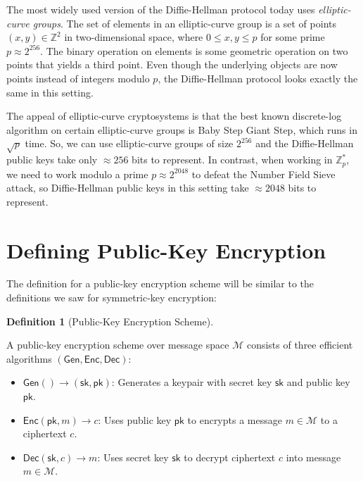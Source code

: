 \documentclass[
  letterpaper,
]{scrbook}
\providecommand{\tightlist}{%
  \setlength{\itemsep}{0pt}\setlength{\parskip}{0pt}}
\newcommand{\Z}{\mathbb{Z}}
\newcommand{\calM}{\mathcal{M}}
\newcommand{\Enc}{\mathsf{Enc}}
\newcommand{\Dec}{\mathsf{Dec}}
\newcommand{\Gen}{\mathsf{Gen}}
\newcommand{\sk}{\mathsf{sk}}
\newcommand{\pk}{\mathsf{pk}}
\theoremstyle{definition}
\newtheorem{definition}{Definition}[chapter]
\theoremstyle{plain}
\theoremstyle{plain}
\theoremstyle{remark}
\begin{document}
The most widely used version of the Diffie-Hellman protocol today uses
\emph{elliptic-curve groups}. The set of elements in an elliptic-curve
group is a set of points \((x,y) \in \Z^2\) in two-dimensional space,
where \(0 \leq x, y \leq p\) for some prime \(p \approx 2^{256}\). The
binary operation on elements is some geometric operation on two points
that yields a third point. Even though the underlying objects are now
points instead of integers modulo \(p\), the Diffie-Hellman protocol
looks exactly the same in this setting.

The appeal of elliptic-curve cryptosystems is that the best known
discrete-log algorithm on certain elliptic-curve groups is Baby Step
Giant Step, which runs in \(\sqrt p\) time. So, we can use
elliptic-curve groups of size \(2^{256}\) and the Diffie-Hellman public
keys take only \(\approx 256\) bits to represent. In contrast, when
working in \(\Z^*_p\), we need to work modulo a prime
\(p \approx 2^{2048}\) to defeat the Number Field Sieve attack, so
Diffie-Hellman public keys in this setting take \(\approx 2048\) bits to
represent.

\section{Defining Public-Key
Encryption}\label{defining-public-key-encryption}

The definition for a public-key encryption scheme will be similar to the
definitions we saw for symmetric-key encryption:

\begin{definition}[Public-Key Encryption
Scheme]\protect\hypertarget{def-pke}{}\label{def-pke}

A public-key encryption scheme over message space \(\calM\) consists of
three efficient algorithms \((\Gen, \Enc, \Dec)\):

\begin{itemize}
\tightlist
\item
  \(\Gen() \to (\sk, \pk)\): Generates a keypair with secret key \(\sk\)
  and public key \(\pk\).
\item
  \(\Enc(\pk, m) \to c\): Uses public key \(\pk\) to encrypts a message
  \(m \in \calM\) to a ciphertext \(c\).
\item
  \(\Dec(\sk, c) \to m\): Uses secret key \(\sk\) to decrypt ciphertext
  \(c\) into message \(m \in \calM\).
\end{itemize}

\end{definition}
\end{document}
